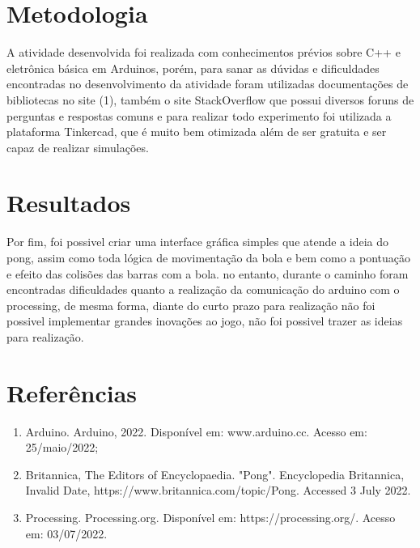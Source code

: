 \documentclass[conference]{IEEEtran}
\begin{document}
\section{Metodologia}
 A atividade desenvolvida foi realizada com conhecimentos prévios sobre C++ e eletrônica básica em Arduinos, porém, para sanar as dúvidas e dificuldades encontradas no
 desenvolvimento da atividade foram utilizadas documentações de bibliotecas no site (1), também o site StackOverflow que possui diversos foruns de perguntas e respostas comuns
 e para realizar todo experimento foi utilizada a plataforma Tinkercad, que é
 muito bem otimizada além de ser gratuita e ser capaz de realizar simulações.

\section{Resultados}
 Por fim, foi possivel criar uma interface gráfica simples que atende a ideia do pong, assim como toda lógica de movimentação da bola e bem como
 a pontuação e efeito das colisões das barras com a bola.
 no entanto, durante o caminho foram encontradas dificuldades quanto a realização
 da comunicação do arduino com o processing, de mesma forma, diante do curto prazo para realização não foi possivel implementar
 grandes inovações ao jogo, não foi possivel trazer as ideias para realização.

\section*{Referências}

\begin{enumerate}
    \item Arduino. Arduino, 2022. Disponível em: www.arduino.cc. Acesso em: 25/maio/2022;
    \item Britannica, The Editors of Encyclopaedia. "Pong". Encyclopedia Britannica, Invalid Date, https://www.britannica.com/topic/Pong. Accessed 3 July 2022.
    \item Processing. Processing.org. Disponível em: https://processing.org/. Acesso em: 03/07/2022.
\end{enumerate}
\end{document}
